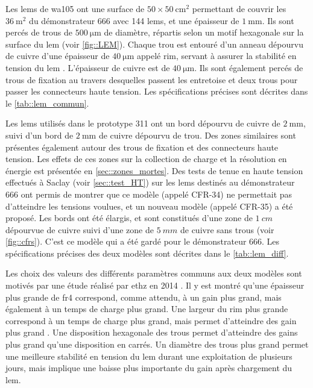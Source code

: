             Les \glspl{lem} de \gls{wa105} ont une surface de $50\times\SI{50}{\centi\meter\squared}$ permettant de couvrir les $\SI{36}{\meter\squared}$ du démonstrateur 666 avec 144 \glspl{lem}, et une épaisseur de $\SI{1}{\milli\meter}$. Ils sont percés de  trous de $\SI{500}{\micro\meter}$ de diamètre, répartis selon un motif hexagonale sur la surface du \gls{lem} (voir \autoref{fig::LEM}). Chaque trou est entouré d'un anneau dépourvu de cuivre d'une épaisseur de $\SI{40}{\micro\meter}$ appelé rim, servant à assurer la stabilité en tension du \gls{lem} \cite{thgem}. L'épaisseur de cuivre est de $\SI{40}{\micro\meter}$. Ils sont également percés de  trous de fixation au travers desquelles passent les entretoise et deux trous pour passer les connecteurs haute tension. Les spécifications précises sont décrites dans le \autoref{tab::lem_commun}.
            
            Les \glspl{lem} utilisés dans le prototype 311 ont un bord dépourvu de cuivre de $\SI{2}{\milli\meter}$, suivi d'un bord de $\SI{2}{\milli\meter}$ de cuivre dépourvu de trou. Des zones similaires sont présentes également autour des trous de fixation et des connecteurs haute tension. Les effets de ces zones sur la collection de charge et la résolution en énergie est présentée en \autoref{sec::zones_mortes}. Des tests de tenue en haute tension effectués à Saclay (voir \autoref{sec::test_HT}) sur les \glspl{lem} destinés au démonstrateur 666 ont permis de montrer que ce modèle (appelé CFR-34) ne permettait pas d'atteindre les tensions voulues, et un nouveau modèle (appelé CFR-35) a été proposé. Les bords ont été élargis, et sont constitués d'une zone de $\SI{1}{cm}$ dépourvue de cuivre suivi d'une zone de $\SI{5}{mm}$ de cuivre sans trous (voir \autoref{fig::cfrs}). C'est ce modèle qui a été gardé pour le démonstrateur 666. Les spécifications précises des deux modèles sont décrites dans le \autoref{tab::lem_diff}.
            
            Les choix des valeurs des différents paramètres communs aux deux modèles sont motivés par une étude réalisé par \gls{ethz} en 2014 \cite{cantini3L}. Il y est montré qu'une épaisseur plus grande de \gls{fr4} correspond, comme attendu, à un gain plus grand, mais également à un temps de charge plus grand. Une largeur du rim plus grande correspond à un temps de charge plus grand, mais permet d'atteindre des gain plus grand \cite{thgem}. Une disposition hexagonale des trous permet d'atteindre des gains plus grand qu'une disposition en carrés. Un diamètre des trous plus grand permet une meilleure stabilité en tension du \gls{lem} durant une exploitation de plusieurs jours, mais implique une baisse plus importante du gain après chargement du \gls{lem}.
            
